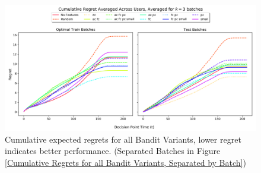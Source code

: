 \begin{figure}[h!]
\includegraphics[width=1.3\textwidth,center]{figures/cum_regret_comparison_grouped.png}%
\caption{Cumulative expected regrets for all Bandit Variants, lower regret indicates better performance. (Separated Batches in Figure \ref{Cumulative Regrets for all Bandit Variants, Separated by Batch})}
\label{Cumulative Regrets for all Bandit Variants}
\end{figure}


